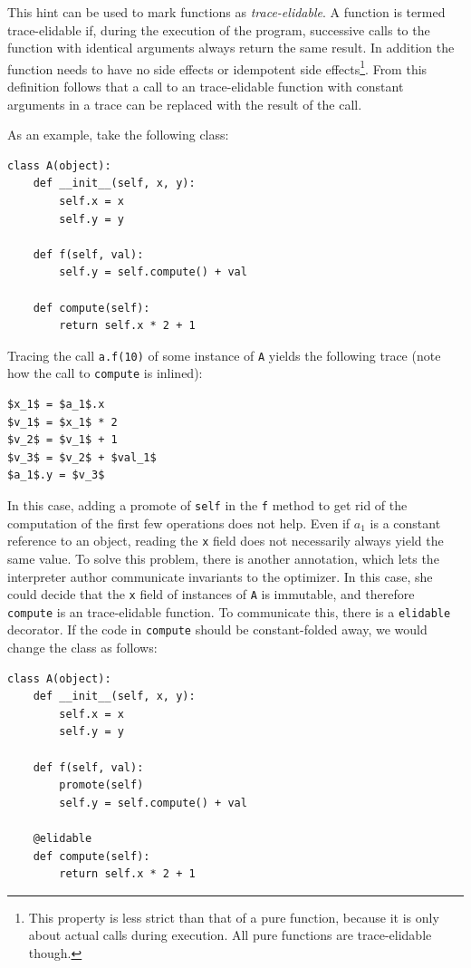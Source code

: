 \documentclass{sigplanconf}
\begin{document}
This hint can be used to mark functions as \emph{trace-elidable}. A function is
termed trace-elidable if, during the execution of the program,
successive calls to the function with identical arguments always return the
same result. In addition the function needs to have no side effects or
idempotent side effects\footnote{This property
is less strict than that of a pure function, because it is only about actual
calls during execution. All pure functions are trace-elidable though.}.
From this definition follows that a call to an trace-elidable function with
constant arguments in a trace can be replaced with the result of the call.

As an example, take the following class:

\begin{lstlisting}[mathescape,basicstyle=\ttfamily]
class A(object):
    def __init__(self, x, y):
        self.x = x
        self.y = y

    def f(self, val):
        self.y = self.compute() + val

    def compute(self):
        return self.x * 2 + 1
\end{lstlisting}

Tracing the call \texttt{a.f(10)} of some instance of \texttt{A} yields the following
trace (note how the call to \texttt{compute} is inlined):
%
\begin{lstlisting}[mathescape,basicstyle=\ttfamily]
$x_1$ = $a_1$.x
$v_1$ = $x_1$ * 2
$v_2$ = $v_1$ + 1
$v_3$ = $v_2$ + $val_1$
$a_1$.y = $v_3$
\end{lstlisting}

In this case, adding a promote of \texttt{self} in the \texttt{f} method to get rid of the
computation of the first few operations does not help. Even if $a_1$ is a
constant reference to an object, reading the \texttt{x} field does not necessarily
always yield the same value. To solve this problem, there is another annotation,
which lets the interpreter author communicate invariants to the optimizer. In
this case, she could decide that the \texttt{x} field of instances of \texttt{A} is
immutable, and therefore \texttt{compute}
is an trace-elidable function. To communicate this, there is a \texttt{elidable} decorator.
If the code in \texttt{compute} should be constant-folded away, we would change the
class as follows:
\begin{lstlisting}[mathescape,basicstyle=\ttfamily]
class A(object):
    def __init__(self, x, y):
        self.x = x
        self.y = y

    def f(self, val):
        promote(self)
        self.y = self.compute() + val

    @elidable
    def compute(self):
        return self.x * 2 + 1
\end{lstlisting}
\end{document}
